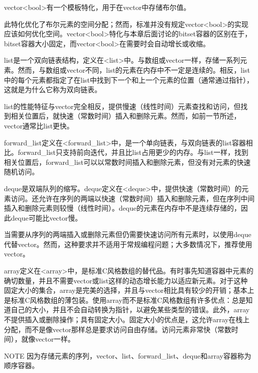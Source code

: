 vector<bool>有一个模板特化，用于在vector中存储布尔值。

此特化优化了布尔元素的空间分配；然而，标准并没有规定vector<bool>的实现应该如何优化空间。vector<bool>特化与本章后面讨论的bitset容器的区别在于，bitset容器大小固定，而vector<bool>在需要时会自动增长或收缩。


list是一个双向链表结构，定义在<list>中。与数组或vector一样，存储一系列元素。然而，与数组或vector不同，list的元素在内存中不一定是连续的。相反，list中的每个元素都指定了在list中找到下一个和上一个元素的位置（通常通过指针），这就是为什么它称为双向链表。

list的性能特征与vector完全相反，提供慢速（线性时间）元素查找和访问，但找到相关位置后，就快速（常数时间）插入和删除元素。然而，如前一节所述，vector通常比list更快。


forward\_list定义在<forward\_list>中，是一个单向链表，与双向链表的list容器相比。forward\_list只支持前向迭代，并且比list占用更少的内存。与list一样，找到相关位置后，forward\_list可以以常数时间插入和删除元素，但没有对元素的快速随机访问。


deque是双端队列的缩写。deque定义在<deque>中，提供快速（常数时间）的元素访问。还允许在序列的两端以快速（常数时间）插入和删除元素，但在序列中间插入和删除元素则较慢（线性时间）。deque的元素在内存中不是连续存储的，因此deque可能比vector慢。

当需要从序列的两端插入或删除元素但仍需要快速访问所有元素时，以使用deque代替vector。然而，这种要求并不适用于常规编程问题；大多数情况下，推荐使用vector。


array定义在<array>中，是标准C风格数组的替代品。有时事先知道容器中元素的确切数量，并且不需要vector或list这样的动态增长能力以适应新元素。对于这种固定大小的集合，array是完美的选择，并且与vector相比具有较少的开销；基本上是标准C风格数组的薄包装。使用array而不是标准C风格数组有许多优点：总是知道自己的大小，并且不会自动转换为指针，以避免某些类型的错误。此外，array不提供插入或删除操作；具有固定大小。固定大小的优点是，这允许array在栈上分配，而不是像vector那样总是要求访问自由存储。访问元素非常快（常数时间），就像vector一样。

\begin{myNotic}{NOTE}
因为存储元素的序列，vector、list、forward\_list、deque和array容器称为顺序容器。
\end{myNotic}

